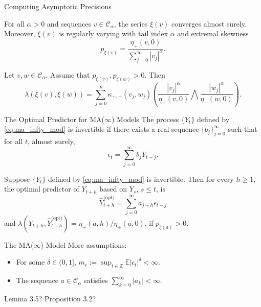 \documentclass{beamer}
\def\E{\mathbb E}
\def\seqSet{\mathcal{C}_{\alpha}}
\def\series{\xi}
\newcommand{\mmultiplier}[4]{\kappa_{#1, #2}(#3, #4)}
\newcommand{\normConst}[3]{\eta_{#1}({#2}, {#3})}
\newcommand{\pred}[1]{\hat{Y}_{t + h}^{\text{(#1)}}}
\begin{document}
\begin{frame}{Computing Asymptotic Precisions}
    \begin{lemma}
        For all $\alpha > 0$ and sequences $v \in \seqSet$, the series $\series(v)$ converges almost surely. Moreover, $\series(v)$ is regularly varying with tail index $\alpha$ and extremal skewness
        \[
        p_{\series(v)} = \frac{\normConst{+}{v}{0}}{\sum_{j = 0}^{\infty} |v_j|^{\alpha}}.
        \]
    \end{lemma}
    \begin{lemma}
        Let $v, w \in \seqSet$. Assume that $p_{\series(v)}, p_{\series(w)} > 0$. Then
        \[
        \lambda\left(\series(v), \series(w)\right)
        = \sum_{j = 0}^{\infty} \mmultiplier{+}{+}{v_j}{w_j}\left(\frac{|v_j|^{\alpha}}{\normConst{+}{v}{0}} \bigwedge \frac{|w_j|^{\alpha}}{\normConst{+}{w}{0}}\right).
        \]
    \end{lemma}
\end{frame}

\begin{frame}{The Optimal Predictor for MA($\infty$) Models}
    The process $\{Y_t\}$ defined by \eqref{eq:ma_infty_mod} is invertible if there exists a real sequence $\{b_j\}_{j = 0}^{\infty}$ such that for all $t$, almost surely,
    \[
    \epsilon_t = \sum_{j = 0}^{\infty} b_j Y_{t - j}.
    \]

    \begin{theorem}
        Suppose $\{Y_t\}$ defined by \eqref{eq:ma_infty_mod} is invertible. Then for every $h \ge 1$, the optimal predictor of $Y_{t + h}$ based on $Y_s$, $s \le t$, is
        \[
        \pred{opt} = \sum_{j = 0}^{\infty} a_{j + h}\epsilon_{t - j}
        \]
        and $\lambda(Y_{t + h}, \pred{opt}) = \normConst{+}{a}{h} / \normConst{+}{a}{0}$, if $p_{\series(a)} > 0$.
    \end{theorem}
\end{frame}

\begin{frame}{The MA($\infty$) Model}
    More assumptions:
    \begin{itemize}
        \item For some $\delta\in (0,1]$, $m_\epsilon :=\sup_{t\in \mathbb Z} \E|\epsilon_t|^\delta <\infty$.
        \item The sequence $a \in \seqSet$ satisfies $\sum_{k=0}^\infty |a_k| <\infty$.
    \end{itemize}
    Lemma 3.5? Proposition 3.2?
\end{frame}
\end{document}
